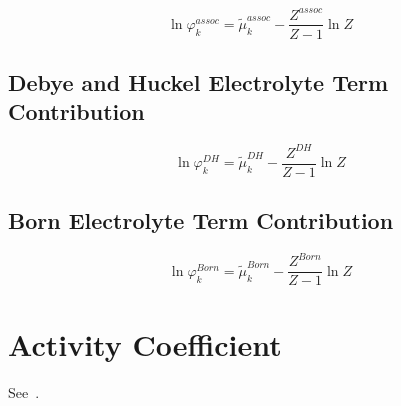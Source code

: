 \documentclass[12pt, letterpaper]{article}
\begin{document}
\begin{equation}
    \ln\varphi_{k}^{assoc}
    =
    \tilde{\mu}_{k}^{assoc}
    -
    \frac{Z^{assoc}}{Z-1}\ln Z
    \label{eq:lnphi_assoc}
\end{equation}

\subsection{Debye and Huckel Electrolyte Term Contribution}


\begin{equation}
    \ln\varphi_{k}^{DH}
    =
    \tilde{\mu}_{k}^{DH}
    -
    \frac{Z^{DH}}{Z-1}\ln Z
    \label{eq:lnphi_dh}
\end{equation}

\subsection{Born Electrolyte Term Contribution}


\begin{equation}
    \ln\varphi_{k}^{Born}
    =
    \tilde{\mu}_{k}^{Born}
    -
    \frac{Z^{Born}}{Z-1}\ln Z
    \label{eq:lnphi_born}
\end{equation}

\section{Activity Coefficient}

See~\cite{Gross2001,Figiel2025}.
\end{document}
